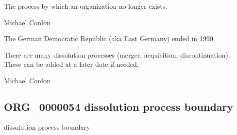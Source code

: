 \documentclass[letterpaper,10pt,english]{sphinxmanual}
\begin{document}
\begin{sphinxShadowBox}

\sphinxAtStartPar
The process by which an organization no longer exists.
\end{sphinxShadowBox}

\begin{sphinxShadowBox}

\sphinxAtStartPar
Michael Conlon 
\end{sphinxShadowBox}

\begin{sphinxShadowBox}

\sphinxAtStartPar
The German Democratic Republic (aka East Germany) ended in 1990.
\end{sphinxShadowBox}

\begin{sphinxShadowBox}

\sphinxAtStartPar
There are many dissolution processes (merger, acquisition, discontinuation).  These can be added at a later date if needed.
\end{sphinxShadowBox}

\begin{sphinxShadowBox}

\sphinxAtStartPar
Michael Conlon 
\end{sphinxShadowBox}
\begin{quote}

\ignorespaces \end{quote}


\subsection{ORG\_0000054 \sphinxhyphen{} dissolution process boundary}
\label{\detokenize{doc-ORG_0000054:org-0000054-dissolution-process-boundary}}\label{\detokenize{doc-ORG_0000054:index-0}}\label{\detokenize{doc-ORG_0000054::doc}}
\begin{sphinxShadowBox}

\sphinxAtStartPar
dissolution process boundary
\end{sphinxShadowBox}
\end{document}
